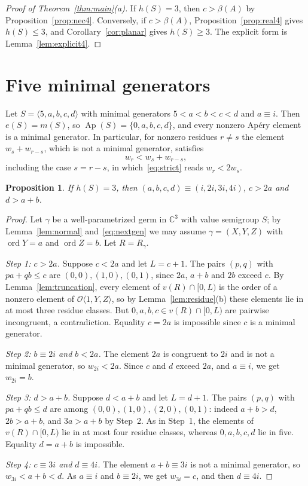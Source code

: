 \documentclass{amsart}
\newtheorem{proposition}[theorem]{Proposition}
\theoremstyle{definition}
\theoremstyle{remark}
\numberwithin{equation}{section}
\newcommand{\C}{\mathbb{C}}
\newcommand{\cO}{\mathcal{O}}
\newcommand{\Ap}{\operatorname{Ap}}
\newcommand{\ord}{\operatorname{ord}}
\newcommand{\gen}[1]{\langle #1\rangle}
\newcommand{\Os}[1]{\cO\langle #1\rangle}
\begin{document}
\begin{proof}[Proof of Theorem~\textup{\ref{thm:main}(a)}]
If $h(S)=3$, then $c>\beta(A)$ by Proposition~\ref{prop:nec4}. Conversely, if $c>\beta(A)$, Proposition~\ref{prop:real4} gives $h(S)\le3$, and Corollary~\ref{cor:planar} gives $h(S)\ge3$. The explicit form is Lemma~\ref{lem:explicit4}.
\end{proof}

\section{Five minimal generators}\label{sec:five}

Let $S=\gen{5,a,b,c,d}$ with minimal generators $5<a<b<c<d$ and $a\equiv i$. Then $e(S)=m(S)$, so $\Ap(S)=\{0,a,b,c,d\}$, and every nonzero Ap\'ery element is a minimal generator. In particular, for nonzero residues $r\ne s$ the element $w_s+w_{r-s}$, which is not a minimal generator, satisfies
\begin{equation}\label{eq:strict}
w_r<w_s+w_{r-s},
\end{equation}
including the case $s=r-s$, in which~\eqref{eq:strict} reads $w_r<2w_s$.

\begin{proposition}\label{prop:nec5}
If $h(S)=3$, then $(a,b,c,d)\equiv(i,2i,3i,4i)$, $c>2a$ and $d>a+b$.
\end{proposition}

\begin{proof}
Let $\gamma$ be a well-parametrized germ in $\C^3$ with value semigroup $S$; by Lemma~\ref{lem:normal} and~\eqref{eq:nextgen} we may assume $\gamma=(X,Y,Z)$ with $\ord Y=a$ and $\ord Z=b$. Let $R=R_\gamma$.

\emph{Step 1: $c>2a$.} Suppose $c<2a$ and let $L=c+1$. The pairs $(p,q)$ with $pa+qb\le c$ are $(0,0),(1,0),(0,1)$, since $2a$, $a+b$ and $2b$ exceed $c$. By Lemma~\ref{lem:truncation}, every element of $v(R)\cap[0,L)$ is the order of a nonzero element of $\Os{1,Y,Z}$, so by Lemma~\ref{lem:residue}(b) these elements lie in at most three residue classes. But $0,a,b,c\in v(R)\cap[0,L)$ are pairwise incongruent, a contradiction. Equality $c=2a$ is impossible since $c$ is a minimal generator.

\emph{Step 2: $b\equiv2i$ and $b<2a$.} The element $2a$ is congruent to $2i$ and is not a minimal generator, so $w_{2i}<2a$. Since $c$ and $d$ exceed $2a$, and $a\equiv i$, we get $w_{2i}=b$.

\emph{Step 3: $d>a+b$.} Suppose $d<a+b$ and let $L=d+1$. The pairs $(p,q)$ with $pa+qb\le d$ are among $(0,0),(1,0),(2,0),(0,1)$: indeed $a+b>d$, $2b>a+b$, and $3a>a+b$ by Step~2. As in Step~1, the elements of $v(R)\cap[0,L)$ lie in at most four residue classes, whereas $0,a,b,c,d$ lie in five. Equality $d=a+b$ is impossible.

\emph{Step 4: $c\equiv3i$ and $d\equiv4i$.} The element $a+b\equiv3i$ is not a minimal generator, so $w_{3i}<a+b<d$. As $a\equiv i$ and $b\equiv2i$, we get $w_{3i}=c$, and then $d\equiv4i$.
\end{proof}
\end{document}
